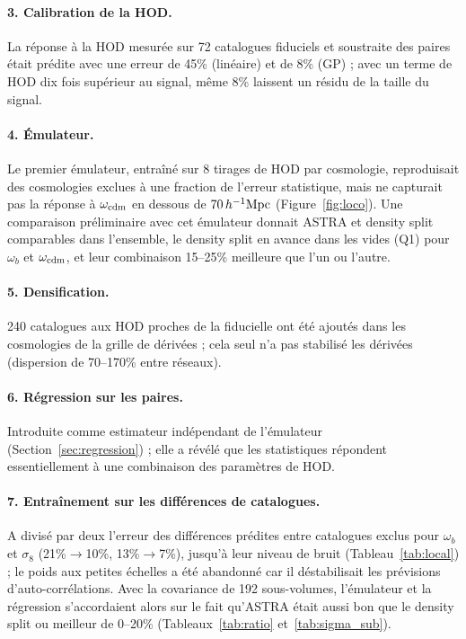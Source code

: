 \paragraph{3. Calibration de la HOD.} La réponse à la HOD mesurée sur 72 catalogues fiduciels et soustraite des paires était prédite avec une erreur de 45\% (linéaire) et de 8\% (GP) ; avec un terme de HOD dix fois supérieur au signal, même 8\% laissent un résidu de la taille du signal.

\paragraph{4. Émulateur.} Le premier émulateur, entraîné sur 8 tirages de HOD par cosmologie, reproduisait des cosmologies exclues à une fraction de l'erreur statistique, mais ne capturait pas la réponse à $\omega_{\rm cdm}$ en dessous de $70\,h^{-1}\mathrm{Mpc}$ (Figure~\ref{fig:loco}). Une comparaison préliminaire avec cet émulateur donnait ASTRA et density split comparables dans l'ensemble, le density split en avance dans les vides (Q1) pour $\omega_b$ et $\omega_{\rm cdm}$, et leur combinaison 15--25\% meilleure que l'un ou l'autre.

\paragraph{5. Densification.} 240 catalogues aux HOD proches de la fiducielle ont été ajoutés dans les cosmologies de la grille de dérivées ; cela seul n'a pas stabilisé les dérivées (dispersion de 70--170\% entre réseaux).

\paragraph{6. Régression sur les paires.} Introduite comme estimateur indépendant de l'émulateur (Section~\ref{sec:regression}) ; elle a révélé que les statistiques répondent essentiellement à une combinaison des paramètres de HOD.

\paragraph{7. Entraînement sur les différences de catalogues.} A divisé par deux l'erreur des différences prédites entre catalogues exclus pour $\omega_b$ et $\sigma_8$ (21\%$\to$10\%, 13\%$\to$7\%), jusqu'à leur niveau de bruit (Tableau~\ref{tab:local}) ; le poids aux petites échelles a été abandonné car il déstabilisait les prévisions d'auto-corrélations. Avec la covariance de 192 sous-volumes, l'émulateur et la régression s'accordaient alors sur le fait qu'ASTRA était aussi bon que le density split ou meilleur de 0--20\% (Tableaux~\ref{tab:ratio} et~\ref{tab:sigma_sub}).

